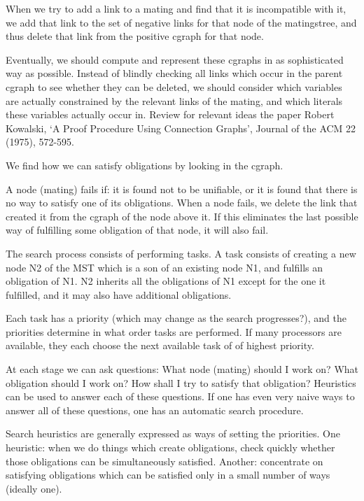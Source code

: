 When we try to add a link to a mating and find that it is
incompatible with it, we add that link to the set of negative links
for that node of the matingstree, and thus delete that link from the
positive cgraph for that node.

Eventually, we should compute and represent these cgraphs in as
sophisticated way as possible. Instead of blindly checking all links
which occur in the parent cgraph to see whether they can be deleted,
we should consider which variables are actually constrained by the
relevant links of the mating, and which literals these variables
actually occur in. Review for relevant ideas the paper
Robert Kowalski, `A Proof Procedure Using
 Connection Graphs', Journal of the ACM 22 (1975), 572-595.

We find how we can satisfy obligations by looking in the cgraph.

A node (mating) fails if:
it is found not to be unifiable, or
it is found that there is no way to satisfy one of its obligations.
When a node fails, we delete the link that created it from the
cgraph of the node above it. If this eliminates the last possible
way of fulfilling some obligation of that node, it will also fail.

The search process consists of performing tasks. A task consists of
creating a new node N2 of the MST which is a son of an existing node
N1, and fulfills an obligation of N1. N2 inherits all the obligations
of N1 except for the one it fulfilled, and it may also have additional
obligations.

Each task has a priority (which may change as the search progresses?),
and the priorities determine in what order tasks are performed. If
many processors are available, they each choose the next available task of
of highest priority.

At each stage we can ask questions:
What node (mating) should I work on?
What obligation should I work on?
How shall I try to satisfy that obligation?
Heuristics can be used to answer each of these questions.
If one has even very naive ways to answer all of these questions,
one has an automatic search procedure.

Search heuristics are generally expressed as ways of setting the priorities.
One heuristic: when we do things which create obligations, check quickly
whether those obligations can be simultaneously satisfied.
Another: concentrate on satisfying obligations which can be
satisfied only in a small number of ways (ideally one).

